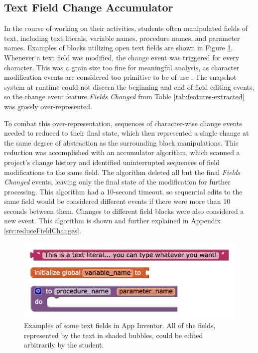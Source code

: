 \subsection{Text Field Change Accumulator}
\label{sec:text-acc}
In the course of working on their activities, students often manipulated fields of text, including text literals, variable names, procedure names, and parameter names. Examples of blocks utilizing open text fields are shown in Figure \ref{fig:text-fields}. Whenever a text field was modified, the change event was triggered for every character. This was a grain size too fine for meaningful analysis, as character modification events are considered too primitive to be of use \citep{omori2008change}. The snapshot system at runtime could not discern the beginning and end of field editing events, so the change event feature \emph{Fields Changed} from Table \ref{tab:features-extracted} was grossly over-represented. 

To combat this over-representation, sequences of character-wise change events needed to reduced to their final state, which then represented a single change at the same degree of abstraction as the surrounding block manipulations. This reduction was accomplished with an accumulator algorithm, which scanned a project's change history and identified uninterrupted sequences of field modifications to the same field. The algorithm deleted all but the final \emph{Fields Changed} events, leaving only the final state of the modification for further processing. This algorithm had a 10-second timeout, so sequential edits to the same field would be considered different events if there were more than 10 seconds between them. Changes to different field blocks were also considered a new event. This algorithm is shown and further explained in Appendix \ref{src:reduceFieldChanges}.

\begin{figure}
  \centering
      \includegraphics[width=\textwidth]{images/ch4-text-fields}
  \caption[Examples of Text Fields in App Inventor]{Examples of some text fields in App Inventor. All of the fields, represented by the text in shaded bubbles, could be edited arbitrarily by the student.}
  \label{fig:text-fields}
\end{figure}


